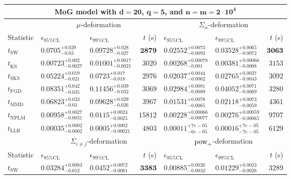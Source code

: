 \begin{tabular}{l|llr|llr}
	\toprule
	\multicolumn{7}{c}{{\bf MoG model with $\mathbf{d=20}$, $\mathbf{q=5}$, and $\mathbf{n=m=2\cdot 10^{4}}$}} \\
	\toprule
	\multicolumn{1}{c}{} & \multicolumn{3}{c}{$\mu$-deformation} & \multicolumn{3}{c}{$\Sigma_{ii}$-deformation} \\
	Statistic & $\epsilon_{95\%\mathrm{CL}}$ & $\epsilon_{99\%\mathrm{CL}}$ & $t$ (s) & $\epsilon_{95\%\mathrm{CL}}$ & $\epsilon_{99\%\mathrm{CL}}$ & $t$ (s) \\
	\midrule
	$t_{\mathrm{SW}}$ & $0.0705_{-0.03}^{+0.029}$ & $0.09728_{-0.027}^{+0.028}$ & ${\mathbf{2879}}$ & $0.02552_{-0.0093}^{+0.0073}$ & $0.03528_{-0.0072}^{+0.0065}$ & ${\mathbf{3063}}$ \\
	$t_{\overline{\mathrm{KS}}}$ & ${\mathbf{0.00723_{-0.0027}^{+0.002}}}$ & ${\mathbf{0.01001_{-0.0021}^{+0.0017}}}$ & $3020$ & ${\mathbf{0.00268_{-0.001}^{+0.00078}}}$ & ${\mathbf{0.00381_{-0.0008}^{+0.00066}}}$ & $3153$ \\
	$t_{\mathrm{SKS}}$ & $0.05224_{-0.021}^{+0.019}$ & $0.0723_{-0.018}^{+0.017}$ & $2976$ & $0.02037_{-0.0062}^{+0.0044}$ & $0.02765_{-0.0043}^{+0.0037}$ & $3092$ \\
	$t_{\mathrm{FGD}}$ & $0.08351_{-0.035}^{+0.042}$ & $0.11456_{-0.032}^{+0.039}$ & $3069$ & $0.02984_{-0.0089}^{+0.0081}$ & $0.04052_{-0.0069}^{+0.0071}$ & $3280$ \\
	$t_{\mathrm{MMD}}$ & $0.06823_{-0.03}^{+0.033}$ & $0.09628_{-0.026}^{+0.029}$ & $3967$ & $0.01531_{-0.0065}^{+0.0078}$ & $0.02118_{-0.0059}^{+0.0073}$ & $4361$ \\
\rowcolor{red!35}	$t_{\mathrm{NPLM}}$ & $0.00958_{-0.0031}^{+0.0027}$ & $0.0115_{-0.0025}^{+0.0024}$ & $15812$ & $0.00228_{-0.00077}^{+0.00066}$ & $0.00276_{-0.00065}^{+0.00059}$ & $9707$ \\
	$t_{\mathrm{LLR}}$ & $0.00035_{-0.0002}^{+0.0002}$ & $0.0005_{-0.00021}^{+0.0002}$ & $4803$ & $0.00011_{-6e-05}^{+7e-05}$ & $0.00016_{-7e-05}^{+7e-05}$ & $6129$ \\
	\toprule
	\multicolumn{1}{c}{} & \multicolumn{3}{c}{$\Sigma_{i\neq j}$-deformation} & \multicolumn{3}{c}{$\rm{pow}_{+}$-deformation} \\
	Statistic & $\epsilon_{95\%\mathrm{CL}}$ & $\epsilon_{99\%\mathrm{CL}}$ & $t$ (s) & $\epsilon_{95\%\mathrm{CL}}$ & $\epsilon_{99\%\mathrm{CL}}$ & $t$ (s) \\
	\midrule
	$t_{\mathrm{SW}}$ & $0.03284_{-0.012}^{+0.0083}$ & $0.0452_{-0.0081}^{+0.0072}$ & ${\mathbf{3383}}$ & $0.00885_{-0.0032}^{+0.0026}$ & $0.01229_{-0.0026}^{+0.0023}$ & $3289$ \\

\end{tabular}
